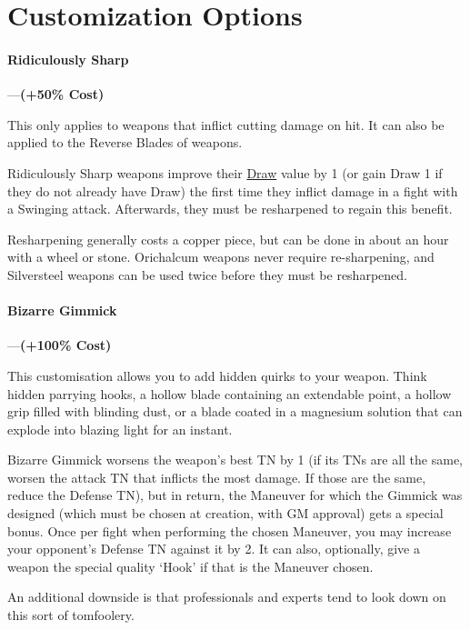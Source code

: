 \documentclass[oneside,11pt,english]{book}
\begin{document}
\section{Customization Options}
\paragraph{\label{par:Ridiculously Sharp}Ridiculously Sharp}---\quad \textbf{(+50\% Cost)}\par
This only applies to weapons that inflict cutting damage on hit. It can also be applied to the Reverse Blades of weapons.

Ridiculously Sharp weapons improve their \hyperref[wepqual:Draw]{Draw} value by
1 (or gain Draw 1 if they do not already have Draw) the first time they inflict
damage in a fight with a Swinging attack. Afterwards, they must be resharpened
to regain this benefit. 

Resharpening generally costs a copper piece, but can be done in about an hour
with a wheel or stone. Orichalcum weapons never require re-sharpening, and
Silversteel weapons can be used twice before they must be resharpened. 

\paragraph{\label{par:Bizarre Gimmick}Bizarre Gimmick}---\quad \textbf{(+100\% Cost)}\par
This customisation allows you to add hidden quirks to your weapon. Think hidden
parrying hooks, a hollow blade containing an extendable point, a hollow grip
filled with blinding dust, or a blade coated in a magnesium solution that can
explode into blazing light for an instant. 

Bizarre Gimmick worsens the weapon’s best TN by 1 (if its TNs are all the same,
worsen the attack TN that inflicts the most damage. If those are the same,
reduce the Defense TN), but in return, the Maneuver for which the Gimmick was
designed (which must be chosen at creation, with GM approval) gets a special
bonus. Once per fight when performing the chosen Maneuver, you may increase your
opponent’s Defense TN against it by 2. It can also, optionally, give a weapon
the special quality ‘Hook’ if that is the Maneuver chosen. 

An additional downside is that professionals and experts tend to look down on this sort of tomfoolery.
\end{document}
